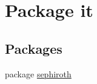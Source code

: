 \hypertarget{namespaceit}{}\section{Package it}
\label{namespaceit}
\subsection*{Packages}
\begin{DoxyCompactItemize}
\item 
package \hyperlink{namespaceit_1_1sephiroth}{sephiroth}
\end{DoxyCompactItemize}
